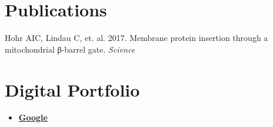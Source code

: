 \documentclass[line,mm]{res} %
\begin{document}
\begin{resume}
\section{\mysidestyle Publications}

Hohr AIC, Lindau C, et. al. 2017. Membrane protein insertion through a mitochondrial β-barrel gate.
\textsl{Science}
 



\section{\mysidestyle Digital Portfolio}
\begin{itemize}
\item \textbf{\href{https://www.google.com/}{Google}} 
\end{itemize}


\end{resume}
\end{document}
